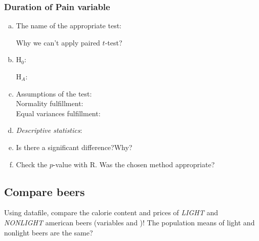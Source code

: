 	
		\subsubsection{Duration of Pain  variable}
		
		\begin{enumerate}[a)]
		\item The name of the appropriate test:	\hrulefill
		
			Why we can't apply paired $t$-test? \hrulefill
		\item H$_0$:	\hrulefill
	
			 H$_A$:	\hrulefill
		\item Assumptions of the test:	\hrulefill
				\\
				Normality fulfillment: \hrulefill
				\\
				Equal variances fulfillment: \hrulefill
				
		\item \emph{Descriptive statistics}: 
			\hrulefill
			
		\item Is there a significant difference?\hrulefill\quad Why? \hrulefill
		
		\item Check the $p$-value with R. Was the chosen method appropriate? \hrulefill
		\end{enumerate}

\clearpage
\subsection{Compare beers}
Using  datafile,  compare the calorie content and prices of \emph{LIGHT} and \emph{NONLIGHT} american beers  (variables  and )!
The population means of light and nonlight beers are the same?

